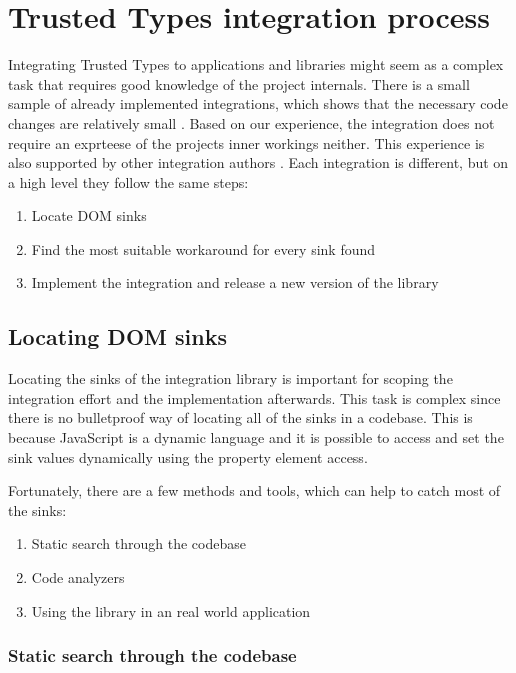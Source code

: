\chapter{Trusted Types integration process}
\label{tt_integration_setup}

Integrating Trusted Types to applications and libraries might seem as a complex task that requires
good knowledge of the project internals. There is a small sample of already implemented
integrations, which shows that the necessary code changes are relatively small
\cite{tt_integration_list}. Based on our experience, the integration does not require an exprteese
of the projects inner workings neither. This experience is also supported by other integration
authors \cite{tt_web_framework_paper}. Each integration is different, but on a high level they
follow the same steps:

\begin{enumerate}
  \item Locate DOM sinks
  \item Find the most suitable workaround for every sink found
  \item Implement the integration and release a new version of the library
\end{enumerate}

\section{Locating DOM sinks}

Locating the sinks of the integration library is important for scoping the integration effort and
the implementation afterwards. This task is complex since there is no bulletproof way of locating
all of the sinks in a codebase. This is because JavaScript is a dynamic language and it is possible
to access and set the sink values dynamically using the property element access.

Fortunately, there are a few methods and tools, which can help to catch most of the sinks:

\begin{enumerate}
  \item Static search through the codebase
  \item Code analyzers
  \item Using the library in an real world application
\end{enumerate}

\subsection{Static search through the codebase}

